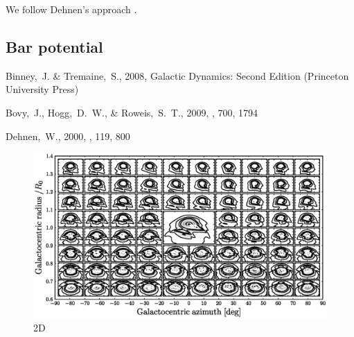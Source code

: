 \documentclass[12pt,preprint]{aastex}
\begin{document}
We follow Dehnen's approach \citep{dehnen00a}.


\subsection{Bar potential}


\begin{thebibliography}{}

{Binney},~J. \& {Tremaine},~S., 2008, {Galactic Dynamics: Second Edition}
  (Princeton University Press)

 Bovy,~J., Hogg,~D.~W., \& Roweis,~S.~T., 2009,
  \apj, 700, 1794

  Dehnen,~W., 2000, \aj, 119, 800

\end{thebibliography}


\clearpage
\begin{figure}
\includegraphics[width=\textwidth]{rphi2d.ps}
\caption{2D}\label{fig:rphi2d}
\end{figure}
\end{document}
